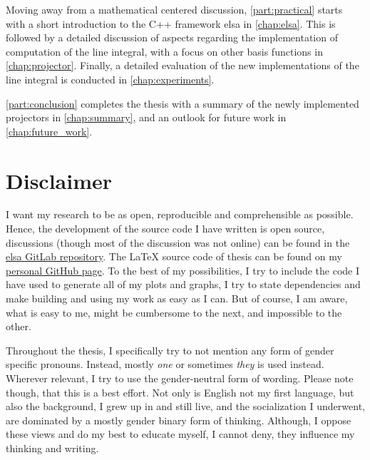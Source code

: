 Moving away from a mathematical centered discussion, \autoref{part:practical} starts with a short
introduction to the C++ framework elsa in \autoref{chap:elsa}. This is followed by a detailed
discussion of aspects regarding the implementation of computation of the line integral, with a focus
on other basis functions in \autoref{chap:projector}. Finally, a detailed evaluation of the new
implementations of the line integral is conducted in \autoref{chap:experiments}.

\autoref{part:conclusion} completes the thesis with a summary of the newly implemented projectors in
\autoref{chap:summary}, and an outlook for future work in \autoref{chap:future_work}.

\section{Disclaimer}\label{sec:disclaimer}

I want my research to be as open, reproducible and comprehensible as possible. Hence, the
development of the source code I have written is open source, discussions (though most of the
discussion was not online) can be found in the \href{https://gitlab.lrz.de/IP/elsa}{elsa GitLab
	repository}. The \LaTeX{} source code of thesis can be found on my
\href{https://github.com/ner0-m/ma-thesis-differential-basis-for-ct}{personal GitHub page}. To the
best of my possibilities, I try to include the code I have used to generate all of my plots and
graphs, I try to state dependencies and make building and using my work as easy as I can. But of
course, I am aware, what is easy to me, might be cumbersome to the next, and impossible to the
other.

Throughout the thesis, I specifically try to not mention any form of gender specific pronouns.
Instead, mostly \textit{one} or sometimes \textit{they} is used instead. Wherever relevant, I try to
use the gender-neutral form of wording. Please note though, that this is a best effort. Not only is
English not my first language, but also the background, I grew up in and still live, and the
socialization I underwent, are dominated by a mostly gender binary form of thinking. Although, I
oppose these views and do my best to educate myself, I cannot deny, they influence my thinking and
writing.
